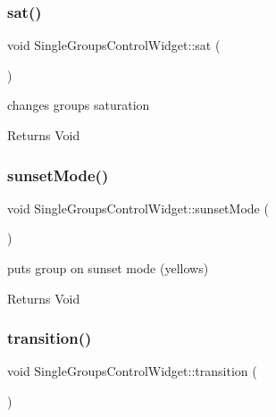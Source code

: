 \subsubsection{\texorpdfstring{sat()}{sat()}}
{\footnotesize\ttfamily void Single\+Groups\+Control\+Widget\+::sat (\begin{DoxyParamCaption}{ }\end{DoxyParamCaption})\hspace{0.3cm}{\ttfamily [private]}}



changes group\textquotesingle{}s saturation 

\begin{DoxyReturn}{Returns}
Void 
\end{DoxyReturn}
\mbox{\label{class_single_groups_control_widget_a6cb68bd462d888756deba16b4e524470}} 
\subsubsection{\texorpdfstring{sunset\+Mode()}{sunsetMode()}}
{\footnotesize\ttfamily void Single\+Groups\+Control\+Widget\+::sunset\+Mode (\begin{DoxyParamCaption}{ }\end{DoxyParamCaption})\hspace{0.3cm}{\ttfamily [private]}}



puts group on sunset mode (yellows) 

\begin{DoxyReturn}{Returns}
Void 
\end{DoxyReturn}
\mbox{\label{class_single_groups_control_widget_a7ac224c22be007e2e3d944a5d93a2778}} 
\subsubsection{\texorpdfstring{transition()}{transition()}}
{\footnotesize\ttfamily void Single\+Groups\+Control\+Widget\+::transition (\begin{DoxyParamCaption}{ }\end{DoxyParamCaption})\hspace{0.3cm}{\ttfamily [private]}}



